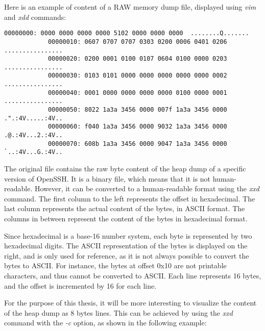     \begin{minipage}{\dimexpr\linewidth-20pt}
        Here is an example of content of a RAW memory dump file, displayed using \textit{vim} and \textit{xdd} commands:

        \begin{lstlisting}[style=hexdump, caption={Hex Dump from \textit{Training/basic/V\_7\_8\_P1/16/5070-1643978841-heap.raw}}]
            00000000: 0000 0000 0000 0000 5102 0000 0000 0000  ........Q.......
            00000010: 0607 0707 0707 0303 0200 0006 0401 0206  ................
            00000020: 0200 0001 0100 0107 0604 0100 0000 0203  ................
            00000030: 0103 0101 0000 0000 0000 0000 0000 0002  ................
            00000040: 0001 0000 0000 0000 0000 0100 0000 0001  ................
            00000050: 8022 1a3a 3456 0000 007f 1a3a 3456 0000  .".:4V.....:4V..
            00000060: f040 1a3a 3456 0000 9032 1a3a 3456 0000  .@.:4V...2.:4V..
            00000070: 608b 1a3a 3456 0000 9047 1a3a 3456 0000  `..:4V...G.:4V..
        \end{lstlisting}
    \end{minipage}

    The original file contains the raw byte content of the heap dump of a specific version of OpenSSH. It is a binary file, which means that it is not human-readable. However, it can be converted to a human-readable format using the \textit{xxd} command. The first column to the left represents the offset in hexadecimal. The last column represents the actual content of the bytes, in ASCII format. The columns in between represent the content of the bytes in hexadecimal format.

    Since hexadecimal is a base-16 number system, each byte is represented by two hexadecimal digits. The ASCII representation of the bytes is displayed on the right, and is only used for reference, as it is not always possible to convert the bytes to ASCII. For instance, the bytes at offset 0x10 are not printable characters, and thus cannot be converted to ASCII. Each line represents 16 bytes, and the offset is incremented by 16 for each line.

    For the purpose of this thesis, it will be more interesting to visualize the content of the heap dump as 8 bytes lines. This can be achieved by using the \textit{xxd} command with the \textit{-c} option, as shown in the following example:

